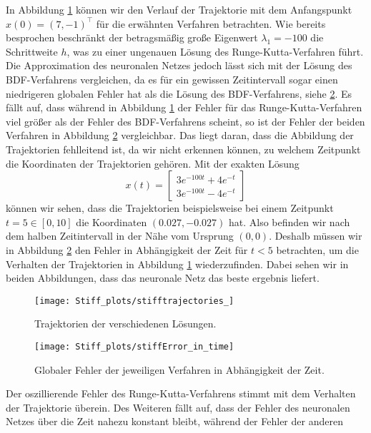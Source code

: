 In Abbildung \ref{fig:stiff-trajectories} können wir den Verlauf der Trajektorie mit dem Anfangspunkt
$x(0)=(7,-1)^{\intercal}$ für die erwähnten Verfahren betrachten. Wie bereits besprochen beschränkt der betragsmäßig große
Eigenwert $\lambda_1=-100$ die Schrittweite $h$, was zu einer ungenauen Lösung des Runge-Kutta-Verfahren führt. Die
Approximation des neuronalen Netzes jedoch lässt sich mit der Lösung des BDF-Verfahrens vergleichen, da es für ein
gewissen Zeitintervall sogar einen niedrigeren globalen Fehler hat als die Lösung des BDF-Verfahrens, siehe
\ref{fig:stiff-error-in-time}. Es fällt auf, dass während in Abbildung \ref{fig:stiff-trajectories} der Fehler für das
Runge-Kutta-Verfahren viel größer als der Fehler des BDF-Verfahrens scheint, so ist der Fehler der beiden Verfahren in
Abbildung \ref{fig:stiff-error-in-time} vergleichbar. Das liegt daran, dass die Abbildung der Trajektorien fehlleitend
ist, da wir nicht erkennen können, zu welchem Zeitpunkt die Koordinaten der Trajektorien gehören. Mit der exakten Lösung
\[
       x(t) = \begin{bmatrix*} 3 e^{-100 t} + 4 e^{- t} \\
              3 e^{-100 t} - 4 e^{-t} \end{bmatrix*}
\]
können wir sehen, dass die Trajektorien beispielsweise bei einem Zeitpunkt $t=5 \in [0, 10]$ die Koordinaten
$(0.027, -0.027)$ hat. Also befinden wir nach dem halben Zeitintervall in der Nähe vom Ursprung $(0,0)$. Deshalb müssen
wir in Abbildung \ref{fig:stiff-error-in-time} den Fehler in Abhängigkeit der Zeit für $t<5$ betrachten, um die
Verhalten der Trajektorien in Abbildung \ref{fig:stiff-trajectories} wiederzufinden. Dabei sehen wir in beiden
Abbildungen, dass das neuronale Netz das beste ergebnis liefert.
\begin{figure}
       \centering
       \texttt{[image: Stiff\_plots/stifftrajectories\_]}
       \caption{Trajektorien der verschiedenen Lösungen.}
       \label{fig:stiff-trajectories}
\end{figure}
\begin{figure}
       \centering
       \texttt{[image: Stiff\_plots/stiffError\_in\_time]}
       \caption{Globaler Fehler  der jeweiligen Verfahren in Abhängigkeit der Zeit.}
       \label{fig:stiff-error-in-time}
\end{figure}
Der oszillierende Fehler des Runge-Kutta-Verfahrens stimmt mit dem Verhalten der Trajektorie überein. Des Weiteren fällt
auf, dass der Fehler des neuronalen Netzes über die Zeit nahezu konstant bleibt, während der Fehler der anderen
